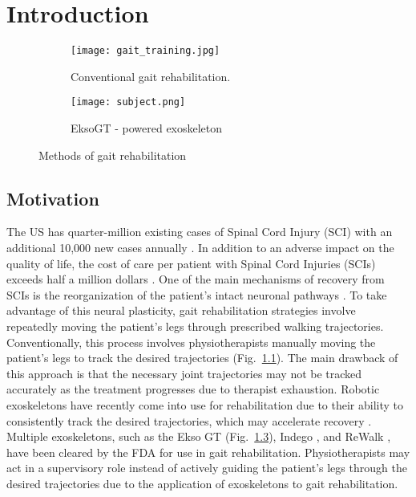 \chapter{Introduction}

\begin{figure}
	\centering
	\begin{subfigure}{0.45\textwidth}
		\centering
		\texttt{[image: gait\_training.jpg]} %
		\caption{Conventional gait rehabilitation. \cite{gaitrehabgantry}}\label{fig:gantry}
	\end{subfigure}\hfill
	\begin{subfigure}{0.45\textwidth}
		\centering
		\texttt{[image: subject.png]}
		\caption{EksoGT - powered exoskeleton}\label{fig:subject}
	\end{subfigure}
	\caption{Methods of gait rehabilitation}
\end{figure}

\section{Motivation}
%

The US has quarter-million existing cases of Spinal Cord Injury (SCI) with an additional 10,000 new cases annually \cite{nih}. In addition to an adverse impact on the quality of life, the cost of care per patient with Spinal Cord Injuries (SCIs) exceeds half a million dollars \cite{devivo2011costs}. One of the main mechanisms of recovery from SCIs is the reorganization of the patient's intact neuronal pathways \cite{curt2008recovery}. To take advantage of this neural plasticity, gait rehabilitation strategies involve repeatedly moving the patient's legs through prescribed walking trajectories. Conventionally, this process involves physiotherapists manually moving the patient's legs to track the desired trajectories (Fig.~\ref{fig:gantry}). The main drawback of this approach is that the necessary joint trajectories may not be tracked accurately as the treatment progresses due to therapist exhaustion. Robotic exoskeletons have recently come into use for rehabilitation due to their ability to consistently track the desired trajectories, which may accelerate recovery \cite{hidler2011role}. Multiple exoskeletons, such as the Ekso GT \cite{brenner2016exploring} (Fig.~\ref{fig:subject}), Indego \cite{sup2008design}, and ReWalk \cite{rewalk}, have been cleared by the FDA for use in gait rehabilitation. Physiotherapists may act in a supervisory role instead of actively guiding the patient's legs through the desired trajectories due to the application of exoskeletons to gait rehabilitation. 

